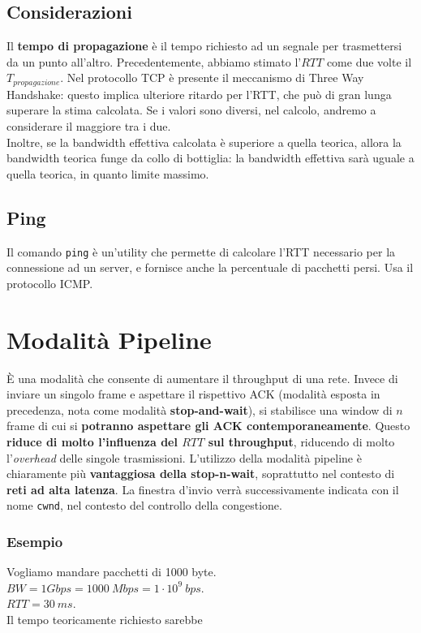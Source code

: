 \subsection{Considerazioni}
Il \textbf{tempo di propagazione} è il tempo richiesto ad un segnale per trasmettersi da un punto all'altro. Precedentemente, abbiamo stimato l'$RTT$ come due volte il $T_{propagazione}$. Nel protocollo TCP è presente il meccanismo di Three Way Handshake: questo implica ulteriore ritardo per l'RTT, che può di gran lunga superare la stima calcolata. Se i valori sono diversi, nel calcolo, andremo a considerare il maggiore tra i due.\\
Inoltre, se la bandwidth effettiva calcolata è superiore a quella teorica, allora la bandwidth teorica funge da collo di bottiglia: la bandwidth effettiva sarà uguale a quella teorica, in quanto limite massimo.

\subsection{Ping}
Il comando \verb|ping| è un'utility che permette di calcolare l'RTT necessario per la connessione ad un server, e fornisce anche la percentuale di pacchetti persi. Usa il protocollo ICMP.

\newpage


\section{Modalità Pipeline}
È una modalità che consente di aumentare il throughput di una rete. Invece di inviare un singolo frame e aspettare il rispettivo ACK (modalità esposta in precedenza, nota come modalità \textbf{stop-and-wait}), si stabilisce una window di $n$ frame di cui si \textbf{potranno aspettare gli ACK contemporaneamente}. Questo\textbf{ riduce di molto l'influenza del $RTT$ sul throughput}, riducendo di molto l'\textit{overhead} delle singole trasmissioni. L'utilizzo della modalità pipeline è chiaramente più \textbf{vantaggiosa della stop-n-wait}, soprattutto nel contesto di \textbf{reti ad alta latenza}. La finestra d'invio verrà successivamente indicata con il nome \verb|cwnd|, nel contesto del controllo della congestione.

\subsubsection{Esempio}
Vogliamo mandare pacchetti di 1000 byte.\\
$BW = 1 Gbps = 1000 \ Mbps = 1\cdot10^{9} \ bps$.\\
$RTT=30 \ ms$.\\
Il tempo teoricamente richiesto sarebbe

